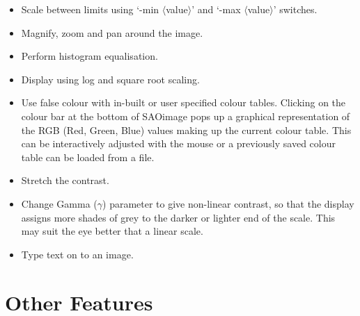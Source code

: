 \begin{itemize}

\item{Scale between limits using `-min $\langle$value$\rangle$' and 
`-max $\langle$value$\rangle$' switches.}

\item{Magnify, zoom and pan around the image.}

\item{Perform histogram equalisation.}

\item{Display using log and square root scaling.}

\item{Use false colour with in-built or user specified colour tables.
Clicking on the colour bar at the bottom of SAOimage pops up a
graphical representation of the RGB (Red, Green, Blue) values making
up the current colour table. This can be interactively adjusted with
the mouse or a previously saved colour table can be loaded from a
file.}

\item{Stretch the contrast.}

\item{Change Gamma ($\gamma$) parameter to give non-linear contrast, so that
the display assigns more shades of grey to the darker or lighter end of
the scale. This may suit the eye better that a linear scale.}

\item{Type text on to an image.}

\end {itemize}

\section{Other Features}

